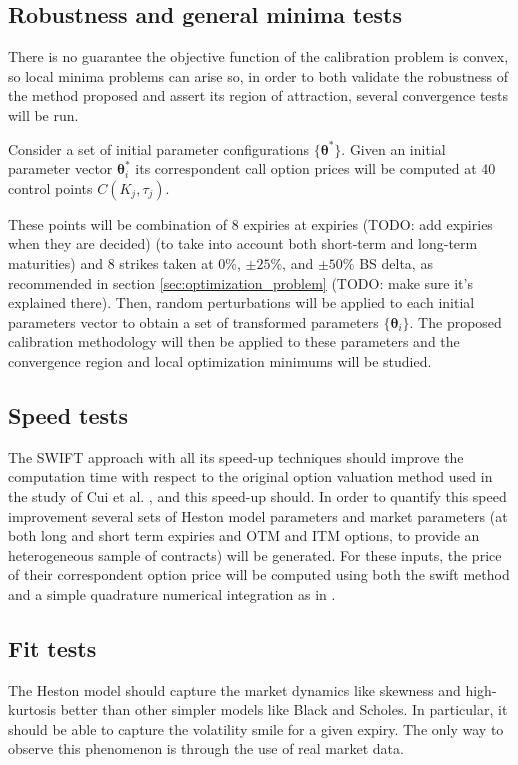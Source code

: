 \documentclass[12,twoside]{mammeTFM}
\theoremstyle{definition}
\theoremstyle{remark}
\begin{document}
\subsection{Robustness and general minima tests} \label{test:robustness}
There is no guarantee the objective function of the calibration problem is convex, so local minima problems can arise so, in order to both validate the robustness of the method proposed and assert its region of attraction, several convergence tests will be run.

Consider a set of initial parameter configurations $\{\boldsymbol{\theta}^*\}$. Given an initial parameter vector $\boldsymbol{\theta}_{i}^*$ its correspondent call option prices will be computed at 40 control points $C(K_j, \tau_j)$.

These points will be combination of 8 expiries at expiries (TODO: add expiries when they are decided) (to take into account both short-term and long-term maturities) and 8 strikes taken at 0\%, $\pm 25 \% $, and $\pm 50 \%$ BS delta, as recommended in section \ref{sec:optimization_problem} (TODO: make sure it's explained there). Then, random perturbations will be applied to each initial parameters vector to obtain a set of transformed parameters
$\{\boldsymbol{\theta}_i\}$. The proposed calibration methodology will then be applied to these parameters and the convergence region and local optimization minimums will be studied.


\subsection{Speed tests}
The SWIFT approach with all its speed-up techniques should improve the computation time with respect to the original option valuation method used in the study of Cui et al. \cite{cui17}, and this speed-up should. In order to quantify this speed improvement several sets of Heston model parameters and market parameters (at both long and short term expiries and OTM and ITM options, to provide an heterogeneous sample of contracts) will be generated. For these inputs, the price of their correspondent option price will be computed using both the swift method and a simple quadrature numerical integration as in \cite{cui17}.

\subsection{Fit tests}
The Heston model should capture the market dynamics like skewness and high-kurtosis better than other simpler models like Black and Scholes. In particular, it should be able to capture the volatility smile for a given expiry. The only way to observe this phenomenon is through the use of real market data.
\end{document}
